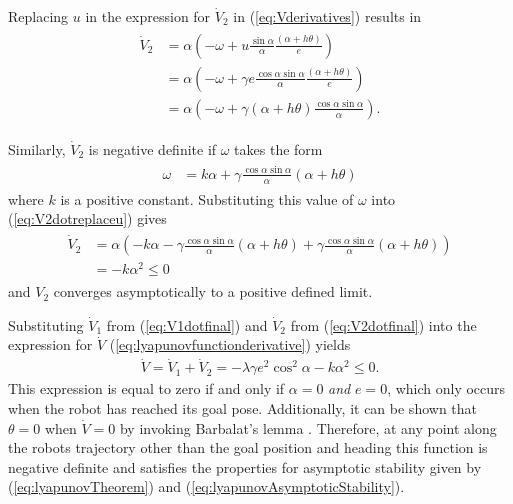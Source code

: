 Replacing $u$ in the expression for $\dot{V}_2$ in (\ref{eq:Vderivatives}) results in
\begin{align}
\label{eq:V2dotreplaceu}
\begin{split}
\dot{V}_2 &= \alpha\left(-\omega+u\frac{\sin\alpha}{\alpha}\frac{(\alpha+h\theta)}{e}\right) \\
&= \alpha\left(-\omega+\gamma e\frac{\cos\alpha\sin\alpha}{\alpha}\frac{(\alpha+h\theta)}{e}\right) \\
&= \alpha\left(-\omega+\gamma(\alpha+h\theta)\frac{\cos\alpha\sin\alpha}{\alpha}\right).
\end{split}
\end{align}

Similarly, $\dot{V}_2$ is negative definite if $\omega$ takes the form
\begin{align}
\label{eq:lyapunovomega}
\begin{split}
\omega &= k\alpha + \gamma\frac{\cos\alpha\sin\alpha}{\alpha}\left(\alpha+h\theta\right)
\end{split}
\end{align}
where $k$ is a positive constant. Substituting this value of $\omega$ into (\ref{eq:V2dotreplaceu}) gives
\begin{align}
\label{eq:V2dotfinal}
\begin{split}
\dot{V}_2 &= \alpha\left(-k\alpha-\gamma\frac{\cos\alpha\sin\alpha}{\alpha}(\alpha+h\theta) + \gamma\frac{\cos\alpha\sin\alpha}{\alpha}(\alpha+h\theta)\right) \\
&= -k\alpha^2 \leq 0
\end{split}
\end{align}
and $V_2$ converges asymptotically to a positive defined limit.

Substituting $\dot{V}_1$ from (\ref{eq:V1dotfinal}) and $\dot{V}_2$ from (\ref{eq:V2dotfinal}) into the expression for $\dot{V}$ (\ref{eq:lyapunovfunctionderivative}) yields
\begin{align*}
\dot{V} = \dot{V}_1 + \dot{V}_2 = -\lambda\gamma e^2\cos^2\alpha - k\alpha^2 \leq 0.
\end{align*}
This expression is equal to zero if and only if $\alpha=0$ \textit{and} $e=0$, which only occurs when the robot has reached its goal pose. Additionally, it can be shown that $\theta=0$ when $\dot{V}=0$ by invoking Barbalat's lemma \cite{Aicardi_UnicycleLyapunov95}. Therefore, at any point along the robots trajectory other than the goal position and heading this function is negative definite and satisfies the properties for asymptotic stability given by (\ref{eq:lyapunovTheorem}) and (\ref{eq:lyapunovAsymptoticStability}).

